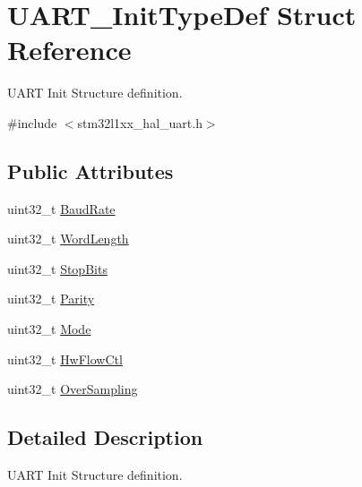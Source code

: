 \hypertarget{struct_u_a_r_t___init_type_def}{\section{U\-A\-R\-T\-\_\-\-Init\-Type\-Def Struct Reference}
\label{struct_u_a_r_t___init_type_def}
}


U\-A\-R\-T Init Structure definition.  




{\ttfamily \#include $<$stm32l1xx\-\_\-hal\-\_\-uart.\-h$>$}

\subsection*{Public Attributes}
\begin{DoxyCompactItemize}
\item 
uint32\-\_\-t \hyperlink{struct_u_a_r_t___init_type_def_ae460c2e4d7ddc67bca9f5756f45b1d83}{Baud\-Rate}
\item 
uint32\-\_\-t \hyperlink{struct_u_a_r_t___init_type_def_a0f1cd85e62aa4fd4b36ee9e610e7789f}{Word\-Length}
\item 
uint32\-\_\-t \hyperlink{struct_u_a_r_t___init_type_def_a6717dfe595617c7b2d57139d9cd306ef}{Stop\-Bits}
\item 
uint32\-\_\-t \hyperlink{struct_u_a_r_t___init_type_def_adc92243425cb18cb8b5f03692841db48}{Parity}
\item 
uint32\-\_\-t \hyperlink{struct_u_a_r_t___init_type_def_ab2ee6ea5a5d4ca5ee6b759be197bcfcb}{Mode}
\item 
uint32\-\_\-t \hyperlink{struct_u_a_r_t___init_type_def_adbf4734130666b94201c6658464c1622}{Hw\-Flow\-Ctl}
\item 
uint32\-\_\-t \hyperlink{struct_u_a_r_t___init_type_def_a77c2c86a2186e09cbf022e27c0c82324}{Over\-Sampling}
\end{DoxyCompactItemize}


\subsection{Detailed Description}
U\-A\-R\-T Init Structure definition. 

